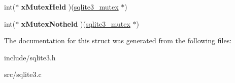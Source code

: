\begin{DoxyCompactItemize}
\item 
\hypertarget{structsqlite3__mutex__methods_a5d30a95c614bc08fe156c9ea0f0d88e8}{int($\ast$ {\bfseries x\-Mutex\-Held} )(\hyperlink{structsqlite3__mutex}{sqlite3\-\_\-mutex} $\ast$)}\label{structsqlite3__mutex__methods_a5d30a95c614bc08fe156c9ea0f0d88e8}

\item 
\hypertarget{structsqlite3__mutex__methods_a7bc1edfd01c67c6dcee26299bc31a7bf}{int($\ast$ {\bfseries x\-Mutex\-Notheld} )(\hyperlink{structsqlite3__mutex}{sqlite3\-\_\-mutex} $\ast$)}\label{structsqlite3__mutex__methods_a7bc1edfd01c67c6dcee26299bc31a7bf}

\end{DoxyCompactItemize}


The documentation for this struct was generated from the following files\-:\begin{DoxyCompactItemize}
\item 
include/sqlite3.\-h\item 
src/sqlite3.\-c\end{DoxyCompactItemize}

